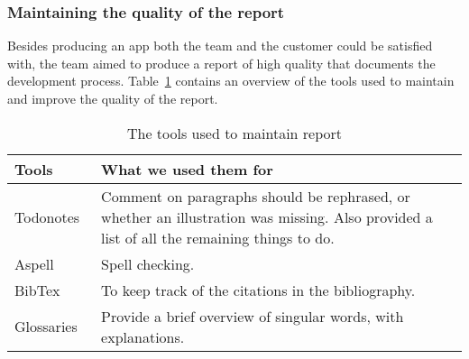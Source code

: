 \subsubsection{Maintaining the quality of the report}
Besides producing an app both the team and the customer could be satisfied with, the team aimed to produce a report of high quality that documents the development process. Table~\ref{tab:reportTools} contains an overview of the tools used to maintain and improve the quality of the report. 

\begin{table}[H]
\begin{tabular}{|l|p{13cm}|}
\hline
\textbf{Tools} & \textbf{What we used them for}\\\hline
Todonotes~\cite{todo}&Comment on paragraphs should be rephrased, or whether an illustration was missing. Also provided a list of all the remaining things to do.\\\hline
Aspell~\cite{aspell} & Spell checking.\\\hline
BibTex~\cite{bibtex}&To keep track of the citations in the bibliography.\\\hline
Glossaries~\cite{glossaries}& Provide a brief overview of singular words, with explanations.\\\hline
\end{tabular}
\caption{The tools used to maintain report}
\label{tab:reportTools}
\end{table}

\begin{comment}
\subsubsection{\textbackslash todonotes}
Feedback is key when creating a product. The \textbackslash todonotes~\cite{todo} package allowed the team to comment on paragraphs and formulations we wanted to rephrase, whether an illustration was missing, and also gave us a list of all the things we had to do, making it easy to get an overview of the remaining tasks regarding the report.\\

\subsubsection{Spell checking: aspell}
Although manual proofreading cannot be avoided, it is advantageous to have a tool to perform automatic spell checking. Aspell~\cite{aspell} is such a tool.\\

\subsubsection{References and glossary}
To keep track of the citations in the bibliography in the report, we used a LaTeX-package called BibTex~\cite{bibtex}, and for our glossaries, a package called glossaries~\cite{glossaries}.

\end{comment}
